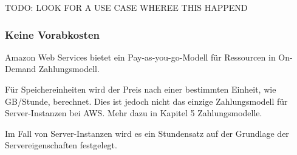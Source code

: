 TODO: LOOK FOR A USE CASE WHEREE THIS HAPPEND

\subsubsection{Keine Vorabkosten}
Amazon Web Services bietet ein Pay-as-you-go-Modell für Ressourcen in On-Demand Zahlungsmodell.

Für Speichereinheiten wird der Preis nach einer bestimmten Einheit, wie GB/Stunde, berechnet.
Dies ist jedoch nicht das einzige Zahlungsmodell für Server-Instanzen bei AWS. Mehr dazu in Kapitel 5 Zahlungsmodelle.


Im Fall von Server-Instanzen wird es ein Stundensatz auf der Grundlage \newline der Servereigenschaften festgelegt.
\\
\begin{comment}
Advantages of Cloud Technology
As the technology has matured over the last decade, companies are moving to the
cloud to lower costs, reduce complexity, and increase flexibility. The cloud
provides scalable and powerful compute solutions, low-cost, reliable storage, and addition, cloud technologies can be used to deploy solutions quickly and cost effectively around the world and on any device.
When you decouple from the data center, you’ll be able to:
x Decrease your TCO: Eliminate many of the costs related to building and
maintaining a data center or colocation deployment. Pay for only the
resources you consume.

x Reduce complexity: Reduce the need to manage infrastructure,
investigate licensing issues, or divert resources.
x Adjust capacity on the fly: Add or reduce resources, depending on
seasonal business needs, using infrastructure that is secure, reliable, and
broadly accessible.
x Reduce time to market: Design and develop new IT projects faster.
x Deploy quickly, even worldwide: Deploy applications across multiple
geographic areas.
x Increase efficiencies: Use automation to reduce or eliminate IT
management activities that waste time and resources.
x Innovate more: Spin up a new server and try out an idea. Each project
moves through the funnel more quickly because the cloud makes it faster
(and cheaper) to deploy, test, and launch new products and services.
x Spend your resources strategically: Switch to a DevOps model to free
your IT staff from operations and maintenance that can be handled by the
cloud services provider.
x Enhance security: Spend less time conducting security reviews on
infrastructure. Mature cloud providers have teams of people who focus on
security, offering best practices to ensure you’re compliant, no matter what
your industry.
\end{comment}

